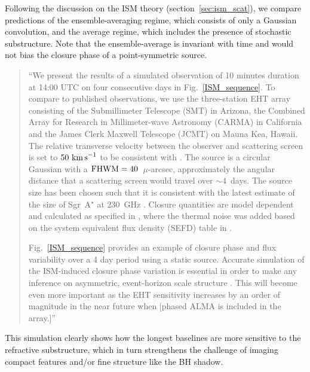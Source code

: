 Following the discussion on the ISM theory (section~\ref{sec:ism_scat}), we compare predictions of the ensemble-averaging regime, which consists of only a Gaussian convolution, and the average regime, which includes the presence of stochastic substructure. Note that the ensemble-average is invariant with time and would not bias the closure phase of a point-symmetric source.
\begin{quotation}  
``We present the results of a simulated observation of 10 minutes duration at 14:00 UTC on four consecutive days in Fig.~\ref{ISM_sequence}. To compare to published observations, we use the three-station EHT array consisting of the Submillimeter Telescope (SMT) in Arizona, the Combined Array for Research in Millimeter-wave Astronomy (CARMA) in California and the James Clerk Maxwell Telescope (JCMT) on Mauna Kea, Hawaii. The relative transverse velocity between the observer and scattering screen is set to $50~\rm{km\,s}^{-1}$ to be consistent with \citet{Ortiz_2016}. The source is a circular Gaussian with a $\rm{FHWM}=40$~$\mu$-arcsec, approximately the angular distance that a scattering screen would travel over $\sim 4$~days. The source size has been chosen such that it is consistent with the latest estimate of the size of Sgr~A$^\star$ at $230$~GHz \citep{Fish_2011}.  Closure quantities are model dependent and calculated as specified in \citet{Rogers_1995}, where the thermal noise was added based on the system equivalent flux density (SEFD) table in \citep{Lu_2014}.


Fig.~\ref{ISM_sequence} provides an example of closure phase and flux variability over a 4 day period using a static source. Accurate simulation of the ISM-induced closure phase variation is essential in order to make any inference on asymmetric, event-horizon scale structure \citep[e.g.][]{Fish_2016,Ortiz_2016}. This will become even more important as the EHT sensitivity increases by an order of magnitude in the near future when [phased ALMA is included in the array.]''
\citep{Blecher_2016} 
\end{quotation}

This simulation clearly shows how the longest baselines are more sensitive to the refractive substructure, which in turn strengthens the challenge of imaging compact features and/or fine structure like the BH shadow. 



